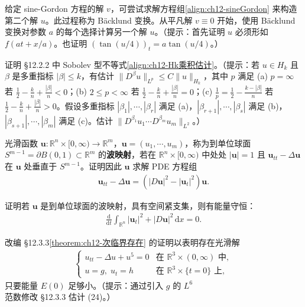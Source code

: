\documentclass[../../main.tex]{subfiles}
\begin{document}
\begin{exercise}[续上题。]\label{exercise:ch12-Backlund}给定 sine-Gordon 方程的解 $v$，可尝试求解方程组\eqref{align:ch12-sineGordon} 来构造第二个解 $u$。此过程称为 B\"acklund 变换。从平凡解 $v\equiv 0$ 开始，使用 B\"acklund 变换对参数 $a$ 的每个选择计算另一个解 $u$。（提示：首先证明 $u$ 必须形如 $f(at+x/a)$。也证明 $(\tan(u/4))_t=a\tan(u/4)$。）
\end{exercise}

\begin{exercise}\label{exercise:ch12-SobolevHk}
证明 \S12.2.2 中 Sobolev 型不等式\eqref{align:ch12-Hk乘积估计}。（提示：若 $u\in H_k$ 且 $\beta$ 是多重指标 $|\beta|\leqslant k$，有估计 $\|D^\beta u\|_{L^p}\leqslant C\|u\|_{H_k}$，其中 $p$ 满足 (a) $p=\infty$ 若 $\frac{1}{2}-\frac{k}{n}+\frac{|\beta|}{n}<0$；(b) $2\leqslant p<\infty$ 若 $\frac{1}{2}-\frac{k}{n}+\frac{|\beta|}{n}=0$；(c) $\frac{1}{p}=\frac{1}{2}-\frac{k-|\beta|}{n}$ 若 $\frac{1}{2}-\frac{k}{n}+\frac{|\beta|}{n}>0$。假设多重指标 $|\beta_1|,\cdots,|\beta_r|$ 满足 (a)，$|\beta_{r+1}|,\cdots,|\beta_s|$ 满足 (b)，$|\beta_{s+1}|,\cdots,|\beta_m|$ 满足 (c)。估计 $\|D^{\beta_1}u_1\cdots D^{\beta_m}u_m\|_{L^2}$。）
\end{exercise}

\begin{exercise}\label{exercise:ch12-波映射}
光滑函数 $\mathbf{u}:\mathbb{R}^n\times[0,\infty)\to\mathbb{R}^m$，$\mathbf{u}=(u_1,\cdots,u_m)$，称为到单位球面 $S^{m-1}=\partial B(0,1)\subset\mathbb{R}^m$ 的\textbf{波映射}，若在 $\mathbb{R}^n\times[0,\infty)$ 中处处 $|\mathbf{u}|=1$ 且 $\mathbf{u}_{tt}-\Delta\mathbf{u}$ 在 $\mathbf{u}$ 处垂直于 $S^{m-1}$。证明因此 $\mathbf{u}$ 求解 PDE 方程组
\begin{align*}
\mathbf{u}_{tt}-\Delta\mathbf{u}=(|D\mathbf{u}|^2-|\mathbf{u}_t|^2)\mathbf{u}.
\end{align*}
\end{exercise}

\begin{exercise}\label{exercise:ch12-波映射能量}
证明若 $\mathbf{u}$ 是到单位球面的波映射，具有空间紧支集，则有能量守恒：
\begin{align*}
\frac{\mathrm{d}}{\mathrm{d}t}\int_{\mathbb{R}^n}|\mathbf{u}_t|^2+|D\mathbf{u}|^2\,\mathrm{d}x=0.
\end{align*}
\end{exercise}

\begin{exercise}[$p=5$ 时的小能量。]\label{exercise:ch12-小能量p5}改编 \S12.3.3\cref{theorem:ch12-次临界存在} 的证明以表明存在光滑解
\begin{align*}
\begin{cases}
u_{tt}-\Delta u+u^5=0 & \text{在 } \mathbb{R}^3\times(0,\infty) \text{ 中},\\
u=g,\;u_t=h & \text{在 } \mathbb{R}^3\times\{t=0\} \text{ 上},
\end{cases}
\end{align*}
只要能量 $E(0)$ 足够小。（提示：通过引入 $g$ 的 $L^6$ 范数修改 \S12.3.3 估计 (24)。）
\end{exercise}
\end{document}
